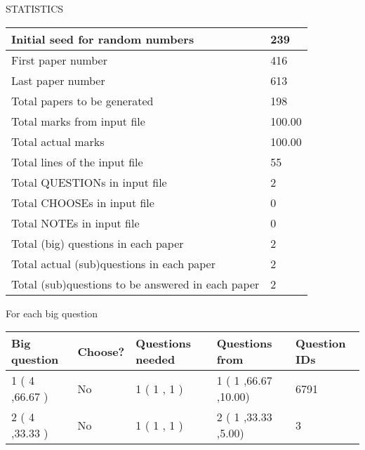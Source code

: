 \documentclass{ctexart}
\begin{document}
   
   
\vspace{0.2in}
\vspace{0.2in}
   
   
 \newpage
\setcounter{page}{1} 
   
   
 {\LARGE{STATISTICS}}
   
\vspace{0.2in}
   
 \begin{tabular}{|l|l|}
 \hline
 Initial seed for random numbers & 239  \\
\hline
 First paper number & 416  \\
\hline
 Last  paper number & 613  \\
\hline
 Total papers to be generated & 198  \\
\hline
Total marks from input file & 100.00 \\
\hline
Total actual marks & 100.00 \\
\hline
 Total lines of the input file & 55  \\
 \hline
 Total QUESTIONs in input file & 2  \\
\hline
 Total CHOOSEs in input file & 0  \\
\hline
 Total NOTEs in input file & 0  \\
\hline
 Total (big) questions in each paper & 2  \\
\hline
 Total actual (sub)questions in each paper & 2  \\
\hline
 Total (sub)questions to be answered in each paper & 2  \\
\hline
 \end{tabular}
   
   
 \newpage
   
{\LARGE{For each big question}}
   
   
\vspace{0.2in}
   
   
\noindent\hspace{-0.4in}\begin{tabular}{|l|l|l|l|l|}
\hline
 Big question & Choose? & Questions needed & Questions from & Question IDs \\ 
\hline
 1 ( 4 ,66.67
 ) &  No   & 
 1 ( 1 ,  1 ) &  1 ( 1
,66.67
 ,10.00) &  6791  \\
 \hline
 2 ( 4 ,33.33
 ) &  No   & 
 1 ( 1 ,  1 ) &  2 ( 1
,33.33
 ,5.00) &  3  \\
 \hline
 \end{tabular}
 
 
\end{document}
